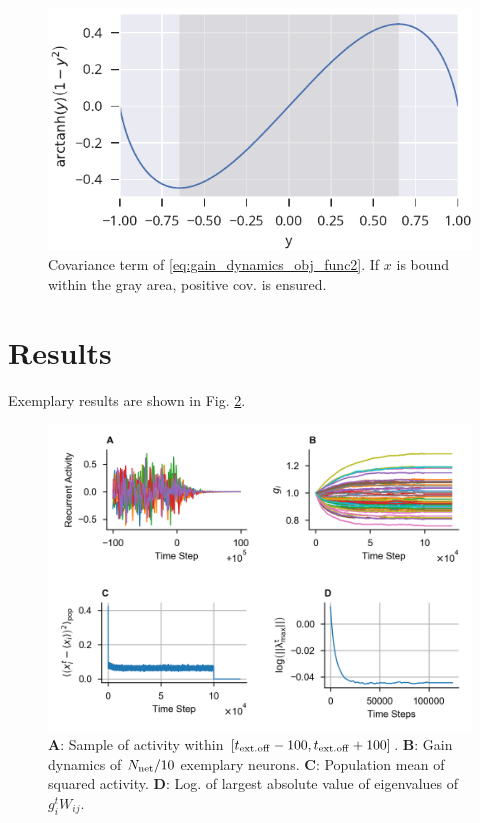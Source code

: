 \documentclass[10pt,a4paper]{article}
\begin{document}
\begin{figure}
	\centering
	\includegraphics{../plots/gain_grad_descent}
	\caption{Covariance term of \eqref{eq:gain_dynamics_obj_func2}. If $x$ is bound within the gray area, positive cov. is ensured.}
	\label{fig:gain_cov}
\end{figure}

\section{Results}
Exemplary results are shown in Fig. \ref{fig:ex_results}.

\begin{figure}[h]
\includegraphics[width=\textwidth]{../plots/res_comp.png}
\caption{{\bf A}: Sample of activity within $\left[ t_{\rm ext.off} - 100, t_{\rm ext.off} + 100 \right]$. {\bf B}: Gain dynamics of $N_{\rm net}/10$ exemplary neurons. {\bf C}: Population mean of squared activity. {\bf D}: Log. of largest absolute value of eigenvalues of $g_i^t W_{ij} $.}
\label{fig:ex_results}
\end{figure}
\end{document}
